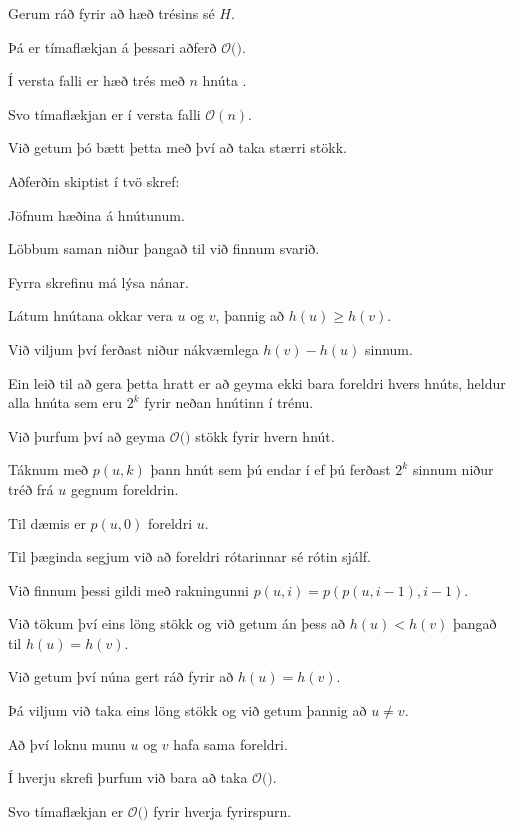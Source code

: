 {
}

{
	{
		\item<1-> Gerum ráð fyrir að hæð trésins sé $H$.
		\item<2-> Þá er tímaflækjan á þessari aðferð $\mathcal{O}($\onslide<3->{$\,H\,$}$)$.
		\item<4-> Í versta falli er hæð trés með $n$ hnúta \onslide<5->{$n - 1$}.
		\item<6-> Svo tímaflækjan er í versta falli $\mathcal{O}(n)$.
		\item<7-> Við getum þó bætt þetta með því að taka stærri stökk.
	}
}

{
	{
		\item<1-> Aðferðin skiptist í tvö skref:
		{
			\item<2-> Jöfnum hæðina á hnútunum.
			\item<3-> Löbbum saman niður þangað til við finnum svarið.
		}
		\item<4-> Fyrra skrefinu má lýsa nánar.
		\item<5-> Látum hnútana okkar vera $u$ og $v$, þannig að $h(u) \geq h(v)$.
		\item<6-> Við viljum því ferðast niður nákvæmlega $h(v) - h(u)$ sinnum.
		\item<7-> Ein leið til að gera þetta hratt er að geyma ekki bara foreldri hvers hnúts,
					heldur alla hnúta sem eru $2^k$ fyrir neðan hnútinn í trénu.
		\item<8-> Við þurfum því að geyma $\mathcal{O}($$)$ stökk fyrir hvern hnút.
		\item<10-> Táknum með $p(u, k)$ þann hnút sem þú endar í ef þú ferðast $2^k$ sinnum niður tréð frá $u$ gegnum foreldrin.
		\item<11-> Til dæmis er $p(u, 0)$ foreldri $u$.
		\item<12-> Til þæginda segjum við að foreldri rótarinnar sé rótin sjálf.
		\item<13-> Við finnum þessi gildi með rakningunni $p(u, i) = p(p(u, i - 1), i - 1)$.
	}
}

{
	{
		\item<1-> Við tökum því eins löng stökk og við getum án þess að $h(u) < h(v)$ þangað til $h(u) = h(v)$.
		\item<2-> Við getum því núna gert ráð fyrir að $h(u) = h(v)$.
		\item<3-> Þá viljum við taka eins löng stökk og við getum þannig að $u \neq v$.
		\item<4-> Að því loknu munu $u$ og $v$ hafa sama foreldri.
	}
}

{
}

{
	{
		\item<1-> Í hverju skrefi þurfum við bara að taka $\mathcal{O}($\onslide<2->{$\log n$}$)$.
		\item<3-> Svo tímaflækjan er $\mathcal{O}($$)$ fyrir hverja fyrirspurn.
	}
}

{
}


